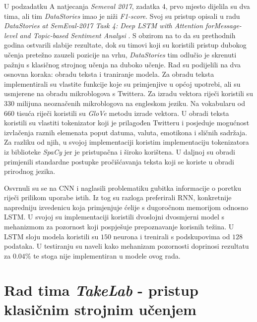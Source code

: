 \documentclass[times, utf8, zavrsni]{fer}
\begin{document}
U podzadatku A natjecanja \emph{Semeval 2017}, zadatka 4, prvo mjesto dijelila su dva tima, ali tim \textit{DataStories} imao je niži \textit{F1-score}. Svoj su pristup opisali u radu \textit{DataStories at SemEval-2017 Task 4: Deep LSTM with Attention forMessage-level and Topic-based Sentiment Analysi} \citep{datastories-Semeval}. S obzirom na to da su prethodnih godina ostvarili slabije rezultate, dok su timovi koji su koristili pristup dubokog učenja pretežno zauzeli pozicije na vrhu, \textit{DataStories} tim odlučio je skrenuti pažnju s klasičnog strojnog učenja na duboko učenje. Rad su podijelili na dva osnovna koraka: obradu teksta i traniranje modela. Za obradu teksta implementirali su vlastite funkcije koje su primjenjive u općoj upotrebi, ali su usmjerene na obradu mikroblogova s Twittera. Za izradu vektora riječi koristili su $330$ milijuna neoznačenih mikroblogova na engleskom jeziku. Na vokabularu od $660$ tisuća riječi koristili su \textit{GloVe} metodu izrade vektora. U obradi teksta koristili su vlastiti tokenizator koji je prilagođen Twitteru i posjeduje mogućnost izvlačenja raznih elemenata poput datuma, valuta, emotikona i sličnih sadržaja. Za razliku od njih, u svojoj implementaciji koristim implementaciju tokenizatora iz biblioteke \textit{SpaCy} jer je pristupačna i široko korištena. U daljnoj su obradi primjenili standardne postupke pročišćavanja teksta koji se koriste u obradi prirodnog jezika.

Osvrnuli su se na \gls{CNN} i naglasili problematiku gubitka informacije o poretku riječi prilikom uporabe istih. Iz tog su razloga preferirali \gls{RNN}, konkretnije napredniju izvedenicu koja primjenjuje ćelije s dugoročnom memorijom odnosno \gls{LSTM}.  U svojoj su implementaciji koristili dvoslojni dvosmjerni model s mehanizmom za pozornost koji pospješuje prepoznavanje korisnih težina. U \gls{LSTM} sloju modela koristili su $150$ neurona i trenirali s podskupovima od $128$ podataka. U testiranju su naveli kako mehanizam pozornosti doprinosi rezultatu za $0.04\%$ te stoga nije implementiran u modele ovog rada.


\section{Rad tima \emph{TakeLab} - pristup klasičnim strojnim učenjem}
\end{document}
